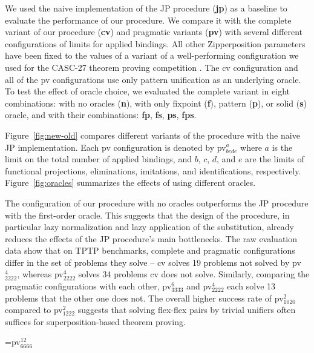 We used the naive implementation of the JP procedure (\textbf{jp}) as a baseline
to evaluate the performance of our procedure. We compare it with the complete
variant of our procedure (\textbf{cv}) and pragmatic variants
(\textbf{pv}) with several different configurations of limits for
applied bindings. All other Zipperposition parameters have been fixed to the values of
a variant of a well-performing configuration we used for the CASC-27 theorem proving competition \cite{gs-19-casc27}.
The cv configuration and all of the pv
configurations use only pattern unification as an underlying oracle. To test
the effect of oracle choice, we evaluated the complete variant
in eight combinations: with no oracles
(\textbf{n}), with only fixpoint (\textbf{f}), pattern (\textbf{p}), or solid (\textbf{s}) oracle,
and with their combinations: \textbf{fp}, \textbf{fs}, \textbf{ps}, \textbf{fps}.

Figure~\ref{fig:new-old} compares different variants of the procedure with the
naive JP implementation. Each pv configuration is denoted by pv$^{a}_{bcde}$
where $a$ is the limit on the total number of applied bindings, and $b$, $c$,
$d$, and $e$ are the limits of functional projections, eliminations, imitations,
and identifications, respectively. Figure~\ref{fig:oracles} summarizes the
effects of using different oracles.

The configuration of our procedure with no oracles outperforms the JP procedure with the first-order oracle. This
suggests that the design of the procedure, in particular lazy normalization and
lazy application of the substitution, already reduces the effects of the JP
procedure's main bottlenecks. The raw evaluation data show that on TPTP benchmarks, complete and pragmatic configurations
differ in the set of problems they solve -- cv solves 19
problems not solved by pv$^{4}_{2222}$, whereas pv$^{4}_{2222}$ solves 34
problems cv does not solve. Similarly, comparing the pragmatic configurations with each other,
pv$^{6}_{3333}$ and pv$^{4}_{2222}$ each solve 13 problems that the other one does not.  The overall higher success rate of pv$^2_{1020}$ compared to
pv$^2_{1222}$ suggests that solving flex-flex pairs by trivial unifiers often
suffices for superposition-based theorem proving. 

\newbox\mybox
\setbox\mybox=\hbox{\small pv$^{12}_{6666}$}

\newcommand\HEAD[1]{\hbox to \wd\mybox{\hfill\hbox{#1}\hfill}}
\newcommand\Z{\phantom{0}}
\newcommand\MIDLINE{\\[.25ex]\hline\rule{0pt}{3ex}}

